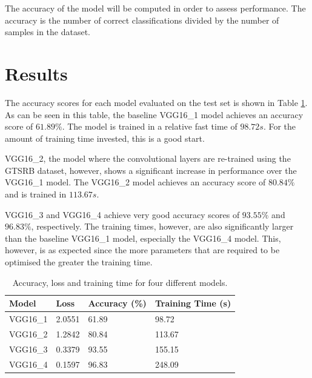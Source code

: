 \documentclass[a4paper,11pt]{article}
\begin{document}
The accuracy of the model will be computed in order to assess performance. The accuracy is the number of correct classifications divided by the number of samples in the dataset.

\section{Results}

The accuracy scores for each model evaluated on the test set is shown in Table \ref{tab:model_accuracy}. As can be seen in this table, the baseline VGG16\_1 model achieves an accuracy score of $61.89\%$. The model is trained in a relative fast time of $98.72s$. For the amount of training time invested, this is a good start. 

VGG16\_2, the model where the convolutional layers are re-trained using the GTSRB dataset, however, shows a significant increase in performance over the VGG16\_1 model. The VGG16\_2 model achieves an accuracy score of $80.84\%$ and is trained in $113.67s$.

VGG16\_3 and VGG16\_4 achieve very good accuracy scores of $93.55\%$ and $96.83\%$, respectively. The training times, however, are also significantly larger than the baseline VGG16\_1 model, especially the VGG16\_4 model. This, however, is as expected since the more parameters that are required to be optimised the greater the training time.

\begin{table}[]
	\begin{center}
	\begin{tabular}{@{}llll@{}}
		\toprule
		Model    & Loss   & Accuracy (\%) & Training Time (s) \\ \midrule
		VGG16\_1 & 2.0551 & 61.89         & 98.72             \\
		VGG16\_2 & 1.2842 & 80.84         & 113.67            \\
		VGG16\_3 & 0.3379 & 93.55         & 155.15            \\
		VGG16\_4 & 0.1597 & 96.83         & 248.09            \\ \bottomrule
	\end{tabular}
	\end{center}
\vspace{-20pt}
\caption{Accuracy, loss and training time for four different models.} \label{tab:model_accuracy}
\vspace{-10pt}
\end{table}
\end{document}
